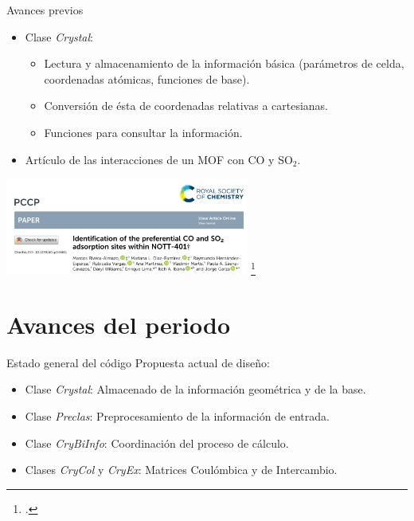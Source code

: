 \documentclass[dvisvgm,11pt,aspectratio=169]{beamer}
\begin{document}
\begin{frame}{Avances previos}
\begin{minipage}{0.98\textwidth}

	\begin{itemize}
		\item Clase \textit{Crystal}:
		\begin{itemize}
			\item Lectura y almacenamiento de la información básica (parámetros de celda, coordenadas atómicas, funciones de base).
			\item Conversión de ésta de coordenadas relativas a cartesianas.
			\item Funciones para consultar la información.
		\end{itemize}
		\item Artículo de las interacciones de un MOF con CO y SO$_2$.\footnotemark
	\end{itemize}
	\centering
	\includegraphics[width=0.6\textwidth]{img/Rivera2021}
	\footcitetext{Rivera-Almazo2021}
	
\end{minipage}
\end{frame}

\section{Avances del periodo}
\begin{frame}{Estado general del código}
	Propuesta actual de diseño:
	\begin{itemize}
		\item Clase \textit{Crystal}: Almacenado de la información geométrica y de la base.
		\item Clase \textit{Preclas}: Preprocesamiento de la información de entrada.
		\item Clase \textit{CryBiInfo}: Coordinación del proceso de cálculo.
		\item Clases \textit{CryCol} y \textit{CryEx}: Matrices Coulómbica y de Intercambio.
	\end{itemize}
\end{frame}
\end{document}
